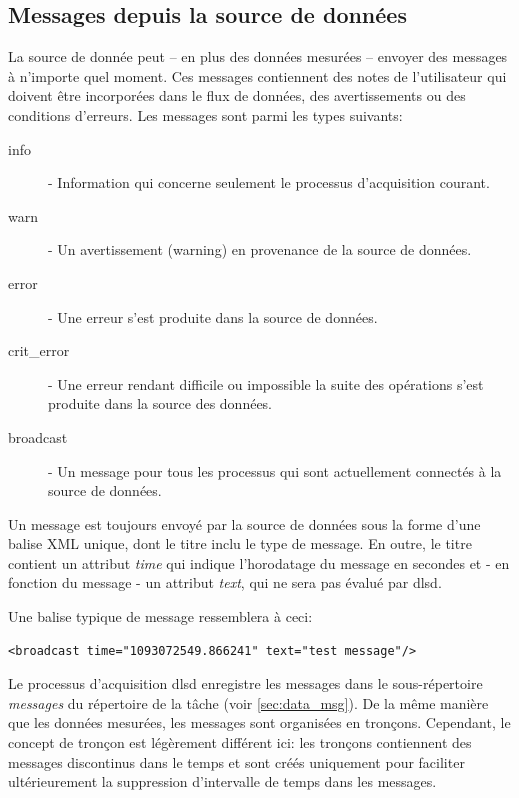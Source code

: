 \documentclass[a4paper,12pt,BCOR6mm,bibtotoc,idxtotoc]{scrbook}
\begin{document}

\subsection{Messages depuis la source de donn\'ees}
\label{sec:dlsd_logger_msg}

La source de donn\'ee peut -- en plus des donn\'ees mesur\'ees --
envoyer des messages \`a n'importe quel moment.  Ces
messages contiennent des notes de l'utilisateur qui doivent \^etre
incorpor\'ees dans le flux de donn\'ees, des avertissements ou des
conditions d'erreurs.  Les messages sont parmi les types suivants:

\begin{description}

\item[info] - Information qui concerne seulement le processus d'acquisition courant.

\item[warn] - Un avertissement (warning) en provenance de la source de donn\'ees.

\item[error] - Une erreur s'est produite dans la source de donn\'ees.

\item[crit\_error] - Une erreur rendant difficile ou impossible la suite des op\'erations
  s'est produite dans la source des donn\'ees.

\item[broadcast] - Un message pour tous les processus qui sont actuellement
  connect\'es \`a la source de donn\'ees.

\end{description}

Un message est toujours envoy\'e par la source de donn\'ees sous la
forme d'une balise XML unique, dont le titre inclu le type de message.
En outre, le titre contient un attribut \textit{time} qui indique
l'horodatage du message en secondes et - en fonction du message - un
attribut \textit{text}, qui ne sera pas \'evalu\'e par dlsd.

Une balise typique de message ressemblera \`a ceci:

\begin{lstlisting}
<broadcast time="1093072549.866241" text="test message"/>
\end{lstlisting}

Le processus d'acquisition dlsd enregistre les messages dans le
sous-r\'epertoire \textit{messages} du r\'epertoire de la t\^ache
(voir \autoref{sec:data_msg}).  De la m\^eme mani\`ere que les
donn\'ees mesur\'ees, les messages sont organis\'ees en tron\c
cons. Cependant, le concept de tron\c con est l\'eg\`erement
diff\'erent ici: les tron\c cons contiennent des messages discontinus
dans le temps et sont cr\'e\'es uniquement pour faciliter
ult\'erieurement la suppression d'intervalle de temps dans les messages.
\end{document}
